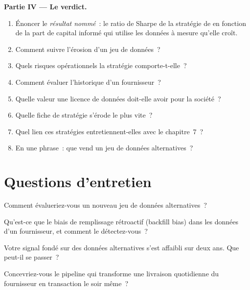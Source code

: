 \begin{problem}
\medskip\noindent\textbf{Partie IV --- Le verdict.}
\begin{enumerate}[resume]
\item Énoncer le \emph{résultat nommé}~: le ratio de Sharpe de la stratégie de  en fonction de la part de capital informé qui utilise les données à mesure qu'elle croît.
\item Comment suivre l'érosion d'un jeu de données~?
\item Quels risques opérationnels la stratégie comporte-t-elle~?
\item Comment évaluer l'historique d'un fournisseur~?
\item Quelle valeur une licence de données doit-elle avoir pour la société~?
\item Quelle fiche de stratégie s'érode le plus vite~?
\item Quel lien ces stratégies entretiennent-elles avec le chapitre~7~?
\item En une phrase~: que vend un jeu de données alternatives~?
\end{enumerate}
\end{problem}

\section{Questions d'entretien}

\begin{interviewq}\label{iq:s1:alternative-data-strategies:1}
Comment évalueriez-vous un nouveau jeu de données alternatives~?
\end{interviewq}

\begin{interviewq}\label{iq:s1:alternative-data-strategies:2}
Qu'est-ce que le biais de remplissage rétroactif (backfill bias) dans les données d'un fournisseur, et comment le détectez-vous~?
\end{interviewq}

\begin{interviewq}\label{iq:s1:alternative-data-strategies:3}
Votre signal fondé sur des données alternatives s'est affaibli sur deux ans. Que peut-il se passer~?
\end{interviewq}

\begin{interviewq}\label{iq:s1:alternative-data-strategies:4}
Concevriez-vous le pipeline qui transforme une livraison quotidienne du fournisseur en transaction le soir même~?
\end{interviewq}

